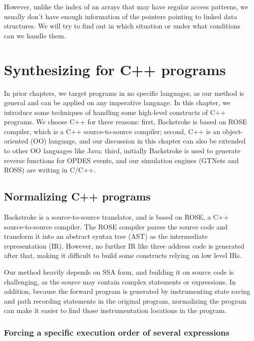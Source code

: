 \documentclass[12pt]{gatech-thesis}
\begin{document}
However, unlike the index of an arrays that may have regular access patterns, we usually don't have enough information of the pointers pointing to linked data structures. 
We will try to find out in which situation or under what conditions can we handle them.




\chapter{Synthesizing for C++ programs}

In prior chapters, we target programs in no specific languages, as our method is general and can be applied on any imperative language.
In this chapter, we introduce some techniques of handling some high-level constructs of C++ programs. 
We choose C++ for three reasons:
first, Backstroke is based on ROSE compiler, which is a C++ source-to-source compiler; 
second, C++ is an object-oriented (OO) language, and our discussion in this chapter can also be extended to other OO languages like Java;
third, initially Backstroke is used to generate reverse functions for OPDES events, and our  simulation engines (GTNets and ROSS) are writing in C/C++.

\section{Normalizing C++ programs}

Backstroke is a source-to-source translator, and is based on ROSE,  a C++ source-to-source compiler. 
The ROSE compiler parses the source code and transform it into an abstract syntax tree (AST) as the intermediate representation (IR).
However, no further IR like three address code is generated after that, making it difficult to build some constructs relying on low level IRs. 

Our method heavily depends on SSA form, and building it on source code is challenging, as the source may contain complex statements or expressions.
In addition, because the forward program is generated by instrumenting state saving and path recording statements in the original program, normalizing the program can make it easier to find those instrumentation locations in the program. 

\subsection{Forcing a specific execution order of several expressions}
\end{document}
